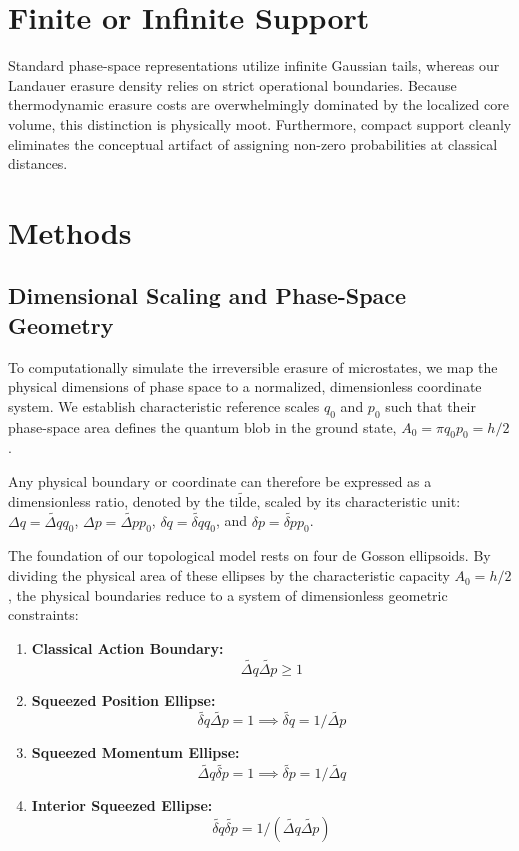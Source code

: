 \documentclass[%
  aps, reprint, prl, amsmath,amssymb
]{revtex4-2}
\begin{document}
\section{Finite or Infinite Support}

Standard phase-space representations utilize infinite Gaussian tails, whereas our Landauer erasure density relies on strict operational boundaries. Because thermodynamic erasure costs are overwhelmingly dominated by the localized core volume, this distinction is physically moot. Furthermore, compact support cleanly eliminates the conceptual artifact of assigning non-zero probabilities at classical distances.

\section{Methods}

\subsection{Dimensional Scaling and Phase-Space Geometry}

To computationally simulate the irreversible erasure of microstates, we map the physical dimensions of phase space to a normalized, dimensionless coordinate system. We establish characteristic reference scales $q_0$ and $p_0$ such that their phase-space area defines the quantum blob in the ground state, $A_0 = \pi q_0 p_0 = h/2$.

Any physical boundary or coordinate can therefore be expressed as a dimensionless ratio, denoted by the $\widetilde{\text{tilde}}$, scaled by its characteristic unit: $\Delta q = \widetilde{\Delta q} q_0$, $\Delta p = \widetilde{\Delta p} p_0$, $\delta q = \widetilde{\delta q} q_0$, and $\delta p = \widetilde{\delta p} p_0$.

The foundation of our topological model rests on four de Gosson ellipsoids. By dividing the physical area of these ellipses by the characteristic capacity $A_0 = h/2$, the physical boundaries reduce to a system of dimensionless geometric constraints:
\begin{enumerate}
    \item \textbf{Classical Action Boundary:} $$\widetilde{\Delta q} \widetilde{\Delta p} \ge 1$$    
    \item \textbf{Squeezed Position Ellipse:} $$\widetilde{\delta q} \widetilde{\Delta p} = 1 \implies \widetilde{\delta q} = 1 / \widetilde{\Delta p}$$
    \item \textbf{Squeezed Momentum Ellipse:} $$\widetilde{\Delta q} \widetilde{\delta p} = 1 \implies \widetilde{\delta p} = 1 / \widetilde{\Delta q}$$
    \item \textbf{Interior Squeezed Ellipse:} $$\widetilde{\delta q} \widetilde{\delta p} = 1 / (\widetilde{\Delta q} \widetilde{\Delta p})$$
\end{enumerate}
\end{document}
